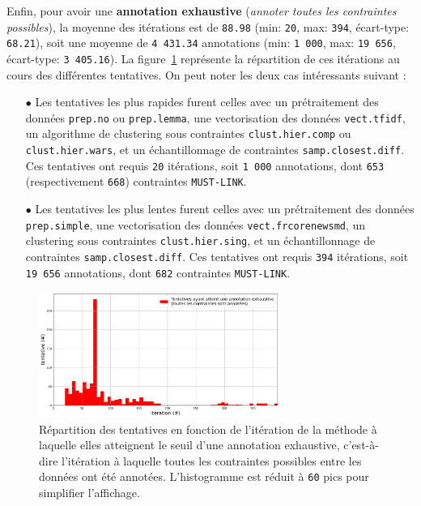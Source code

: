 			Enfin, pour avoir une \textbf{annotation exhaustive} (\textit{annoter toutes les contraintes possibles}), la moyenne des itérations est de \texttt{88.98} (min: \texttt{20}, max: \texttt{394}, écart-type: \texttt{68.21}), soit une moyenne de \texttt{4 431.34} annotations (min: \texttt{1 000}, max: \texttt{19 656}, écart-type: \texttt{3 405.16}).
			La figure~\ref{figure:4.2.1-ETUDE-OPTIMISATION-HISTOGRAMME-ANNOTATION-EXHAUSTIVE} représente la répartition de ces itérations au cours des différentes tentatives.
			On peut noter les deux cas intéressants suivant :
			\begin{itemize}
				\item[\(\bullet\)] Les tentatives les plus rapides furent celles avec un prétraitement des données \texttt{prep.no} ou \texttt{prep.lemma}, une vectorisation des données \texttt{vect.tfidf}, un algorithme de clustering sous contraintes \texttt{clust.hier.comp} ou \texttt{clust.hier.wars}, et un échantillonnage de contraintes \texttt{samp.closest.diff}. Ces tentatives ont requis \texttt{20} itérations, soit \texttt{1 000} annotations, dont \texttt{653} (respectivement \texttt{668}) contraintes \texttt{MUST-LINK}.
				\item[\(\bullet\)] Les tentatives les plus lentes furent celles avec un prétraitement des données \texttt{prep.simple}, une vectorisation des données \texttt{vect.frcorenewsmd}, un clustering sous contraintes \texttt{clust.hier.sing}, et un échantillonnage de contraintes \texttt{samp.closest.diff}. Ces tentatives ont requis \texttt{394} itérations, soit \texttt{19 656} annotations, dont \texttt{682} contraintes \texttt{MUST-LINK}.
			\end{itemize}
			\begin{figure}[!htb]
				\centering
				\includegraphics[width=0.7\textwidth]{figures/etude-efficience-histogramme-annotation-exhaustive}
				\caption{Répartition des tentatives en fonction de l'itération de la méthode à laquelle elles atteignent le seuil d'une annotation exhaustive, c'est-à-dire l'itération à laquelle toutes les contraintes possibles entre les données ont été annotées. L'histogramme est réduit à \texttt{60} pics pour simplifier l'affichage.}
				\label{figure:4.2.1-ETUDE-OPTIMISATION-HISTOGRAMME-ANNOTATION-EXHAUSTIVE}
			\end{figure}
